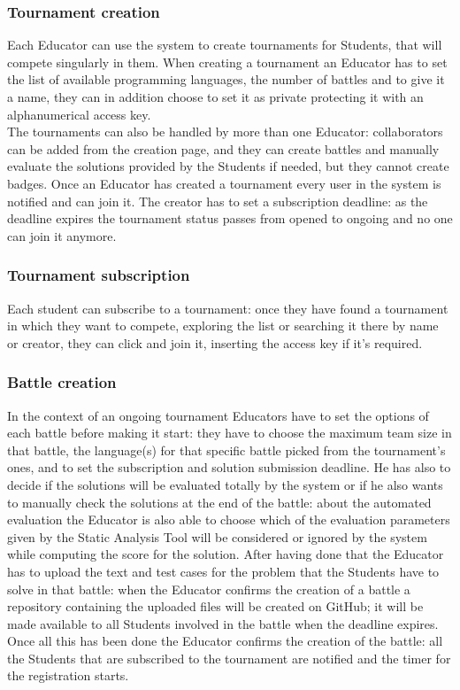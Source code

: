 \documentclass{article}
\begin{document}
\subsubsection{Tournament creation}
Each Educator can use the system to create tournaments for Students, that will compete singularly in them.
When creating a tournament an Educator has to set the list of available programming languages, the number of battles and to give it a name, they can in addition choose to set it as private protecting it with an alphanumerical access key.\\
The tournaments can also be handled by more than one Educator: collaborators can be added from the creation page, and they can create battles and manually evaluate the solutions provided by the Students if needed, but they cannot create badges.
Once an Educator has created a tournament every user in the system is notified and can join it.
The creator has to set a subscription deadline: as the deadline expires the tournament status passes from opened to ongoing and no one can join it anymore.
\subsubsection{Tournament subscription}
Each student can subscribe to a tournament: once they have found a tournament in which they want to compete, exploring the list or searching it there by name or creator, they can click and join it, inserting the access key if it's required.
\subsubsection{Battle creation}
In the context of an ongoing tournament Educators have to set the options of each battle before making it start: they have to choose the maximum team size in that battle, the language(s) for that specific battle picked from the tournament's ones, and to set the subscription and solution submission deadline.
He has also to decide if the solutions will be evaluated totally by the system or if he also wants to manually check the solutions at the end of the battle: about the automated evaluation the Educator is also able to choose which of the evaluation parameters given by the Static Analysis Tool will be considered or ignored by the system while computing the score for the solution. 
After having done that the Educator has to upload the text and test cases for the problem that the Students have to solve in that battle: when the Educator confirms the creation of a battle a repository containing the uploaded files will be created on GitHub; it will be made available to all Students involved in the battle when the deadline expires.
Once all this has been done the Educator confirms the creation of the battle: all the Students that are subscribed to the tournament are notified and the timer for the registration starts.
\end{document}
